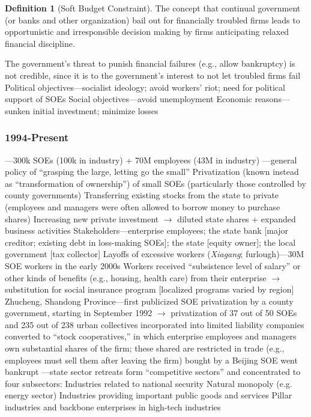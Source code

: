 \documentclass[11pt]{article}
\theoremstyle{definition}
\newtheorem{definition}{Definition}[section]
\theoremstyle{remark}
\begin{document}
\begin{definition}[Soft Budget Constraint]
The concept that continual government (or banks and other organization) bail out for financially troubled firms leads to opportunistic and irresponsible decision making by firms anticipating relaxed financial discipline.
\begin{outline}[enumerate]
\1 The government's threat to punish financial failures  (e.g., allow bankruptcy) is not credible, since it is to the government's interest to not let troubled firms fail
	\2 Political objectives---socialist ideology; avoid workers' riot; need for political support of SOEs
	\2 Social objectives---avoid unemployment
	\2 Economic reasons---sunken initial investment; minimize losses
\end{outline}
\end{definition}

\subsubsection{1994-Present}
\begin{outline}[enumerate]
---300k SOEs (100k in industry) + 70M employees (43M in industry)
---general policy of ``grasping the large, letting go the small''
	\2 Privatization (known instead as ``transformation of ownership'') of small SOEs (particularly those controlled by county governments)
		\3 Transferring existing stocks from the state to private (employees and managers were often allowed to borrow money to purchase shares)
		\3 Increasing new private investment $\to$ diluted state shares + expanded business activities
		\3 Stakeholders---enterprise employees; the state bank [major creditor; existing debt in loss-making SOEs]; the state [equity owner]; the local government [tax collector]
	\2 Layoffs of excessive workers (\textit{Xiagang}; furlough)---30M SOE workers in the early 2000s
		\3 Workers received ``subsistence level of salary'' or other kinds of benefits (e.g., housing, health care) from their enterprise $\to$ substitution for social insurance program [localized programs varied by region]
	\2 Zhucheng, Shandong Province---first publicized SOE privatization by a county government, starting in September 1992 $\to$ privatization of 37 out of 50 SOEs and 235 out of 238 urban collectives
		 incorporated into limited liability companies
		 converted to ``stock cooperatives,'' in which enterprise employees and managers own substantial shares of the firm; these shared are restricted in trade (e.g., employees must sell them after leaving the firm)
		 bought by a Beijing SOE
		 went bankrupt
---state sector retreats form ``competitive sectors'' and concentrated to four subsectors:
	\2 Industries related to national security
	\2 Natural monopoly (e.g. energy sector)
	\2 Industries providing important public goods and services
	\2 Pillar industries and backbone enterprises in high-tech industries
\end{outline}
\end{document}
